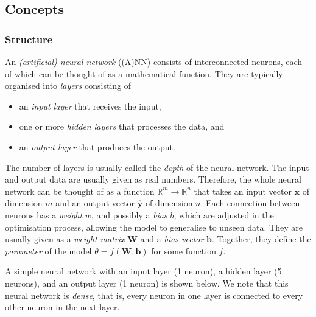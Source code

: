 \documentclass[a4paper,11pt,titlepage]{article}
\theoremstyle{definition}
\theoremstyle{plain}
\theoremstyle{remark}
\begin{document}
\subsection{Concepts}

\subsubsection{Structure}

An \textit{(artificial) neural network} ((A)NN) consists of interconnected neurons, each of which can be thought of as a mathematical function. They are typically organised into \textit{layers} consisting of

\begin{itemize}
    \item an \textit{input layer} that receives the input,
    \item one or more \textit{hidden layers} that processes the data, and
    \item an \textit{output layer} that produces the output.
\end{itemize}

The number of layers is usually called the \textit{depth} of the neural network. The input and output data are usually given as real numbers. Therefore, the whole neural network can be thought of as a function $\mathbb{R}^m\rightarrow\mathbb{R}^n$ that takes an input vector $\mathbf{x}$ of dimension $m$ and an output vector $\mathbf{\hat{y}}$ of dimension $n$. Each connection between neurons has a \textit{weight} $w$, and possibly a \textit{bias} $b$, which are adjusted in the optimisation process, allowing the model to generalise to unseen data. They are usually given as a \textit{weight matrix} $\mathbf{W}$ and a \textit{bias vector} $\mathbf{b}$. Together, they define the \textit{parameter} of the model $\theta = f(\mathbf{W}, \mathbf{b})$ for some function $f$.

A simple neural network with an input layer (1 neuron), a hidden layer (5 neurons), and an output layer (1 neuron) is shown below. We note that this neural network is \textit{dense}, that is, every neuron in one layer is connected to every other neuron in the next layer.
\end{document}
